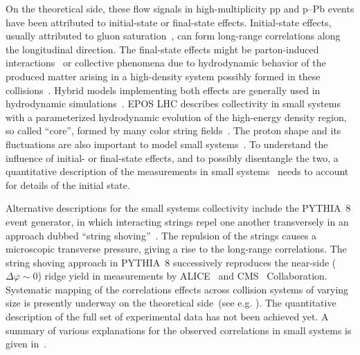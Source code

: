 On the theoretical side, these flow signals in high-multiplicity pp and p--Pb events have been attributed to initial-state or final-state effects. Initial-state effects, usually attributed to gluon saturation~\cite{Dusling:2012cg,Bzdak:2013zma}, can form long-range
correlations along the longitudinal direction. The final-state effects might be parton-induced interactions~\cite{Arbuzov:2011yr} or collective phenomena due to hydrodynamic behavior of the produced matter arising in a high-density system possibly formed in these collisions~\cite{Weller:2017tsr,Zhao:2017rgg}. 
Hybrid models implementing both effects are generally used in hydrodynamic simulations~\cite{Greif:2017bnr,Mantysaari:2017cni}. EPOS LHC describes collectivity in small systems with a parameterized hydrodynamic evolution of the high-energy density region, so called ``core'', formed by many color string fields~\cite{Pierog:2013ria}.
The proton shape and its fluctuations are also important to model small systems~\cite{Mantysaari:2017cni}.
To understand the influence of initial- or final-state effects, and to possibly disentangle the two, a quantitative description of the measurements in small systems~\cite{Schenke:2019pmk,Schenke:2020mbo} needs to account for details of the initial state.

Alternative descriptions for the small systems collectivity include the PYTHIA~8 event generator, in which interacting strings repel one another transversely in an approach dubbed ``string shoving''~\cite{Bierlich:2017vhg,Bierlich:2019ixq}. The repulsion of the strings causes a microscopic transverse pressure, giving a rise to the long-range correlations. The string shoving approach in PYTHIA~8 successively reproduces the near-side ($\Delta\varphi\sim0$) ridge yield in measurements by ALICE~\cite{ALICE:2021nir} and CMS~\cite{Khachatryan:2016txc} Collaboration. Systematic mapping of the correlations effects across collision systems of varying size is presently underway on the theoretical side~(see e.g. \cite{Schenke:2020mbo}).
The quantitative description of the full set of experimental data has not been achieved yet. A summary of various explanations for the observed correlations in small systems is given in~\cite{Strickland:2018exs,Loizides:2016tew,Nagle:2018nvi}. 

